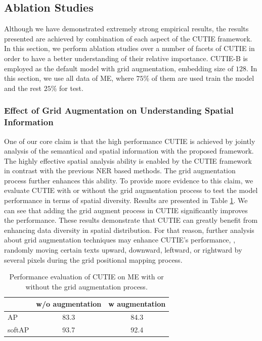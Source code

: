 \documentclass[10pt,twocolumn,letterpaper]{article}
\begin{document}
\subsection{Ablation Studies}
Although we have demonstrated extremely strong empirical results, the results presented are achieved by combination of each aspect of the CUTIE framework. In this section, we perform ablation studies over a number of facets of CUTIE in order to have a better understanding of their relative importance. CUTIE-B is employed as the default model with grid augmentation, embedding size of $128$. In this section, we use all data of ME, where $75\%$ of them are used train the model and the rest $25\%$ for test.

\subsubsection{Effect of Grid Augmentation on Understanding Spatial Information}
One of our core claim is that the high performance CUTIE is achieved by jointly analysis of the semantical and spatial information with the proposed framework. The highly effective spatial analysis ability is enabled by the CUTIE framework in contrast with the previous NER based methods. The grid augmentation process further enhances this ability. To provide more evidence to this claim, we evaluate CUTIE with or without the grid augmentation process to test the model performance in terms of spatial diversity. Results are presented in Table \ref{tab:augmentation}. We can see that adding the grid augment process in CUTIE significantly improves the performance. These results demonstrate that CUTIE can greatly benefit from enhancing data diversity in spatial distribution. For that reason, further analysis about grid augmentation techniques may enhance CUTIE's performance, \eg, randomly moving certain texts upward, downward, leftward, or rightward by several pixels during the grid positional mapping process. 
\begin{table}
	\caption{Performance evaluation of CUTIE on ME with or without the grid augmentation process.}
\begin{center}
\begin{tabular}{l | c | c}
	 & w/o augmentation & w augmentation \\
	\hline
	AP & 83.3 & 84.3 \\
	softAP & 93.7 & 92.4 \\
\end{tabular}
\end{center}
	\label{tab:augmentation}
\end{table}
\end{document}
